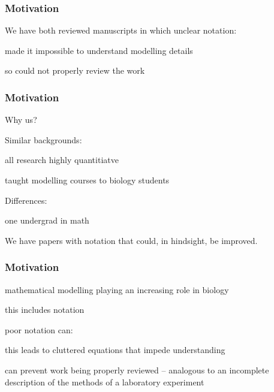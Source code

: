 
\begin{frame}
\frametitle{Motivation}

We have both reviewed manuscripts in which unclear notation:
\bi
\item made it impossible to understand modelling details
\item {}
\item so could not properly review the work
\ei

\end{frame}


\begin{frame}
\frametitle{Motivation}

Why us?

\medskip

Similar backgrounds:
\bi
\item all research highly quantitiatve
\item {}
\item taught modelling courses to biology students
\ei

\medskip
Differences:
\bi
\item one undergrad in math
\item {}
\ei

\medskip

We have papers with notation that could, in hindsight, be improved.

\end{frame}



\begin{frame}
\frametitle{Motivation}
\bi
\item mathematical modelling playing an increasing role in biology
\item {}
\item this includes notation
\item {}
\pause
\item poor notation can:
  \bi
  \item {}
  \item this leads to cluttered equations that impede understanding
  \item {}
  \item can prevent work being properly reviewed -- analogous to an
      incomplete description of the methods of a laboratory experiment
  \ei
\ei
\end{frame}

